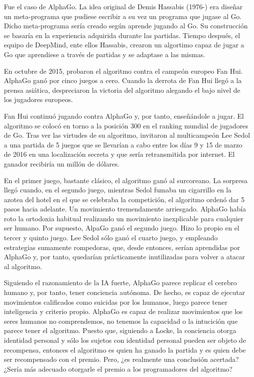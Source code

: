 \documentclass[main.tex]{subfiles}
\begin{document}
Fue el caso de AlphaGo. La idea original de Demis Hassabis (1976-) era diseñar un meta-programa que pudiese escribir a su vez un programa que jugase al  Go. Dicho meta-programa sería creado según aprende jugando al Go. Su construcción se basaría en la experiencia adquirida durante las partidas. Tiempo después, el equipo de DeepMind, ente ellos Hassabis, crearon un algortimo capaz de jugar a Go que aprendiese a través de partidas y se adaptase a las mismas.

En octubre de 2015, probaron el algoritmo contra el campeón europeo Fan Hui. AlphaGo ganó por cinco juegos a cero.  Cuando la derrota de Fan Hui llegó a la prensa asiática, despreciaron la victoria del algoritmo alegando el bajo nivel de los jugadores europeos.

Fan Hui continuó jugando contra AlphaGo y, por tanto, enseñándole a jugar. El algoritmo se colocó en torno a la posición 300 en el ranking mundial de jugadores de Go. Tras ver las virtudes de su algoritmo, invitaron al multicampeón Lee Sedol a una partida de 5 juegos que se llevarían a cabo entre los días 9 y 15 de marzo de 2016 en una localización secreta y que sería retransmitida por internet.  El ganador recibiría un millón de dólares.

En el primer juego, bastante clásico, el algoritmo ganó al surcoreano. La sorpresa llegó cuando, en el segundo juego, mientras Sedol fumaba un cigarrillo en la azotea del hotel en el que se celebraba la competición, el algoritmo ordenó dar 5 pasos hacia adelante. Un movimiento tremendamente arriesgado. AlphaGo había roto la ortodoxia habitual realizando un movimiento inexplicable para cualquier ser humano. Por supuesto, AlpaGo ganó el segundo juego. Hizo lo propio en el tercer y quinto juego. Lee Sedol sólo ganó el cuarto juego, y empleando estrategias sumamente rompedoras, que, desde entonces, serían aprendidas por AlphaGo y, por tanto, quedarían prácticamente inutilizadas para volver a atacar al algoritmo.


Siguiendo el razonamiento de la IA fuerte, AlphaGo parece replicar el cerebro humano y, por tanto, tener conciencia autónoma. De hecho, es capaz de ejecutar movimientos calificados como suicidas por los humanos, luego parece tener inteligencia y criterio propio. AlphaGo es capaz de realizar movimientos que los seres humanos no comprendemos, no tenemos la capacidad o la intucición que parece tener el algoritmo. Puesto que, siguiendo a Locke, la conciencia otorga identidad personal y sólo los sujetos con identidad personal pueden ser objeto de recompensa, entonces el algoritmo es quien ha ganado la partida y es quien debe ser recompensado con el premio. Pero, ¿es realmente una conclusión acertada? ¿Sería más adecuado otorgarle el premio a los programadores del algoritmo?
\end{document}
